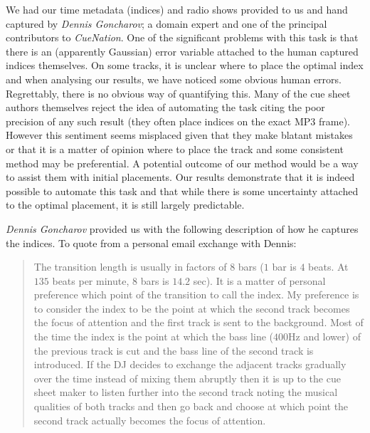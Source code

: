 \documentclass[twocolumn]{article}
\begin{document}
	We had our time metadata (indices) and radio shows provided to us and hand captured by \textit{Dennis Goncharov}; a domain expert and one of the principal contributors to \textit{CueNation}. One of the significant problems with this task is that there is an (apparently Gaussian) error variable attached to the human captured indices themselves. On some tracks, it is unclear where to place the optimal index and when analysing our results, we have noticed some obvious human errors. Regrettably, there is no obvious way of quantifying this. Many of the cue sheet authors themselves reject the idea of automating the task citing the poor precision of any such result (they often place indices on the exact MP3 frame). However this sentiment seems misplaced given that they make blatant mistakes or that it is a matter of opinion where to place the track and some consistent method may be preferential. A potential outcome of our method would be a way to assist them with initial placements. Our results demonstrate that it is indeed possible to automate this task and that while there is some uncertainty attached to the optimal placement, it is still largely predictable.
	
	\textit{Dennis Goncharov} provided us with the following description of how he captures the indices. To quote from a personal email exchange with Dennis:
	
	\begin{quote}
		The transition length is usually in factors of $8$ bars ($1$ bar is $4$ beats. At $135$ beats per minute, $8$ bars is $14.2$ sec). It is a matter of personal preference which point of the transition to call the index. My preference is to consider the index to be the point at which the second track becomes the focus of attention and the first track is sent to the background. Most of the time the index is the point at which the bass line ($400$Hz and lower) of the previous track is cut and the bass line of the second track is introduced. If the DJ decides to exchange the adjacent tracks gradually over the time instead of mixing them abruptly then it is up to the cue sheet maker to listen further into the second track noting the musical qualities of both tracks and then go back and choose at which point the second track actually becomes the focus of attention.
	\end{quote}
	
\end{document}
